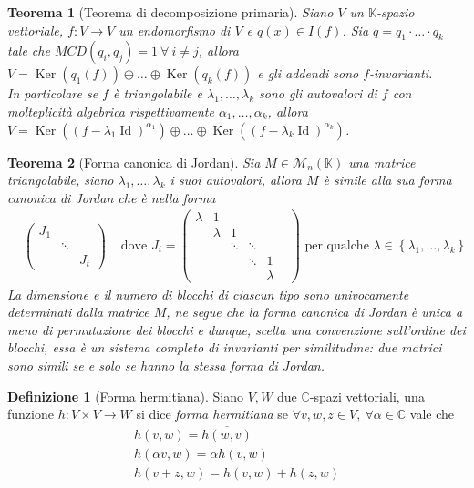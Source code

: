 \documentclass[11pt]{article}
\theoremstyle{plain}
\newtheorem{thm}{Teorema}[section]
\theoremstyle{definition}
\newtheorem{defn}{Definizione}[section]
\theoremstyle{remark}
\newcommand{\C}{\mathbb{C}}
\newcommand{\K}{\mathbb{K}}
\newcommand{\matrices}{\mathcal{M}}
\DeclareMathOperator{\Ker}{Ker}
\DeclareMathOperator{\Id}{Id}
\begin{document}
\begin{thm}[Teorema di decomposizione primaria]
\label{thm:dec_primaria}
	Siano $V$ un $\K$-spazio vettoriale, $f:V\to V$ un endomorfismo di $V$ e $q(x)\in I(f)$. Sia $q=q_1\cdot\ldots\cdot q_k$ tale che $MCD(q_i,q_j)=1\ \forall\ i\neq j$, allora $V=\Ker(q_1(f))\oplus\dots\oplus \Ker(q_k(f))$ e gli addendi sono $f$-invarianti.\\
	In particolare se $f$ è triangolabile e $\lambda_1,\ldots,\lambda_k$ sono gli autovalori di $f$ con molteplicità algebrica rispettivamente $\alpha_1,\ldots,\alpha_k$, allora $V=\Ker\left((f-\lambda_1 \Id)^{\alpha_1}\right)\oplus\dots\oplus \Ker\left((f-\lambda_k \Id)^{\alpha_k}\right)$.
\end{thm}

\begin{thm}[Forma canonica di Jordan]
	Sia $M\in \matrices_n(\K)$ una matrice triangolabile, siano $\lambda_1,\ldots,\lambda_k$ i suoi autovalori, allora $M$ è simile alla sua \textit{forma canonica di Jordan} che è nella forma
	\begin{align*}
		&\begin{pmatrix}
			J_1 & & \\
			& \ddots & \\
			& & J_t
		\end{pmatrix}
		&\text{ dove }J_i=\begin{pmatrix}
		                  	\lambda & 1 & & & \\
							& \lambda & 1 & & \\
		                  	& & \ddots & \ddots & \\
		                  	& & & \ddots & 1 & \\
		                  	& & & & \lambda
		                  \end{pmatrix} \text{ per qualche }\lambda \in \left\{ \lambda_1,\ldots,\lambda_k \right\}
	\end{align*}
	La dimensione e il numero di blocchi di ciascun tipo sono univocamente determinati dalla matrice $M$, ne segue che la forma canonica di Jordan è unica a meno di permutazione dei blocchi e dunque, scelta una convenzione sull'ordine dei blocchi, essa è un sistema completo di invarianti per similitudine: due matrici sono simili se e solo se hanno la stessa forma di Jordan.

\end{thm}
\begin{defn}[Forma hermitiana]
Siano $V,W$ due $\C$-spazi vettoriali, una funzione $h:V\times V\to W$ si dice \textit{forma hermitiana} se $\forall v,w,z\in V,\ \forall \alpha \in \C$ vale che
\begin{gather*}
	h(v,w) = \overline{h(w,v)}\\
	h(\alpha v, w) = \alpha h(v,w)\\
	h(v+z,w)=h(v,w)+h(z,w)
\end{gather*}
\end{defn}
\end{document}
